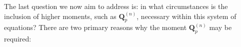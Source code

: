 The last question we now aim to address is: in what circumstances is the inclusion of higher moments, such as $\textbf{Q}_p^{(n)}$, necessary within this system of equations?
There are two primary reasons why the moment $\textbf{Q}_p^{(n)}$ may be required:
